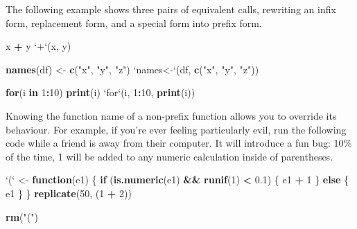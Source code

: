 \documentclass[]{book}
\newenvironment{Shaded}{\begin{snugshade}}{\end{snugshade}}
\newcommand{\ControlFlowTok}[1]{\textcolor[rgb]{0.13,0.29,0.53}{\textbf{#1}}}
\newcommand{\DataTypeTok}[1]{\textcolor[rgb]{0.13,0.29,0.53}{#1}}
\newcommand{\DecValTok}[1]{\textcolor[rgb]{0.00,0.00,0.81}{#1}}
\newcommand{\FloatTok}[1]{\textcolor[rgb]{0.00,0.00,0.81}{#1}}
\newcommand{\KeywordTok}[1]{\textcolor[rgb]{0.13,0.29,0.53}{\textbf{#1}}}
\newcommand{\NormalTok}[1]{#1}
\newcommand{\OperatorTok}[1]{\textcolor[rgb]{0.81,0.36,0.00}{\textbf{#1}}}
\newcommand{\StringTok}[1]{\textcolor[rgb]{0.31,0.60,0.02}{#1}}
\theoremstyle{definition}
\theoremstyle{definition}
\theoremstyle{definition}
\theoremstyle{remark}
\begin{document}
The following example shows three pairs of equivalent calls, rewriting
an infix form, replacement form, and a special form into prefix form.

\begin{Shaded}
\begin{Highlighting}[]
\NormalTok{x }\OperatorTok{+}\StringTok{ }\NormalTok{y}
\StringTok{`}\DataTypeTok{+}\StringTok{`}\NormalTok{(x, y)}

\KeywordTok{names}\NormalTok{(df) <-}\StringTok{ }\KeywordTok{c}\NormalTok{(}\StringTok{"x"}\NormalTok{, }\StringTok{"y"}\NormalTok{, }\StringTok{"z"}\NormalTok{)}
\StringTok{`}\DataTypeTok{names<-}\StringTok{`}\NormalTok{(df, }\KeywordTok{c}\NormalTok{(}\StringTok{"x"}\NormalTok{, }\StringTok{"y"}\NormalTok{, }\StringTok{"z"}\NormalTok{))}

\ControlFlowTok{for}\NormalTok{(i }\ControlFlowTok{in} \DecValTok{1}\OperatorTok{:}\DecValTok{10}\NormalTok{) }\KeywordTok{print}\NormalTok{(i)}
\StringTok{`}\DataTypeTok{for}\StringTok{`}\NormalTok{(i, }\DecValTok{1}\OperatorTok{:}\DecValTok{10}\NormalTok{, }\KeywordTok{print}\NormalTok{(i))}
\end{Highlighting}
\end{Shaded}

Knowing the function name of a non-prefix function allows you to
override its behaviour. For example, if you're ever feeling particularly
evil, run the following code while a friend is away from their computer.
It will introduce a fun bug: 10\% of the time, 1 will be added to any
numeric calculation inside of parentheses.

\begin{Shaded}
\begin{Highlighting}[]
\StringTok{`}\DataTypeTok{(}\StringTok{`}\NormalTok{ <-}\StringTok{ }\ControlFlowTok{function}\NormalTok{(e1) \{}
  \ControlFlowTok{if}\NormalTok{ (}\KeywordTok{is.numeric}\NormalTok{(e1) }\OperatorTok{&&}\StringTok{ }\KeywordTok{runif}\NormalTok{(}\DecValTok{1}\NormalTok{) }\OperatorTok{<}\StringTok{ }\FloatTok{0.1}\NormalTok{) \{}
\NormalTok{    e1 }\OperatorTok{+}\StringTok{ }\DecValTok{1}
\NormalTok{  \} }\ControlFlowTok{else}\NormalTok{ \{}
\NormalTok{    e1}
\NormalTok{  \}}
\NormalTok{\}}
\KeywordTok{replicate}\NormalTok{(}\DecValTok{50}\NormalTok{, (}\DecValTok{1} \OperatorTok{+}\StringTok{ }\DecValTok{2}\NormalTok{))}
\end{Highlighting}
\end{Shaded}

\begin{Shaded}
\begin{Highlighting}[]
\KeywordTok{rm}\NormalTok{(}\StringTok{"("}\NormalTok{)}
\end{Highlighting}
\end{Shaded}
\end{document}
